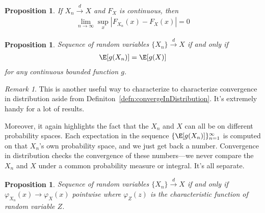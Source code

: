 \documentclass[12pt]{article}
\theoremstyle{plain}
\newtheorem{prop}[thm]{Proposition}
\theoremstyle{definition}
\theoremstyle{remark}
\newtheorem*{rmk}{Remark}
\newcommand{\ra}{\rightarrow}
\newcommand{\dto}{\xrightarrow{d}}
\newcommand{\ninf}{_{n=1}^\infty}
\newcommand{\limn}{\lim_{n\rightarrow\infty}}
\begin{document}
\begin{prop}
If $X_n\dto X$ and $F_X$ is continuous, then
\begin{align*}
  \limn \sup_x |F_{X_n}(x)-F_X(x)| = 0
\end{align*}
\end{prop}

\begin{prop}
Sequence of random variables $\{X_n\} \dto X$ if and only if
\begin{align*}
  \E[g(X_n)] = \E[g(X)]
\end{align*}
for any continuous bounded function $g$.
\end{prop}
\begin{rmk}
This is another useful way to characterize to characterize convergence
in distribution aside from Definiton~\ref{defn:convergeInDistribution}.
It's extremely handy for a lot of results.

Moreover, it again highlights the fact that the $X_n$ and $X$ can all be
on different probability spaces. Each expectation in the sequence
$\{\E[g(X_n)]\}\ninf$ is computed on that $X_n$'s own probability space,
and we just get back a number. Convergence in distribution checks the
convergence of these numbers---we never compare the $X_n$ and $X$ under
a common probability measure or integral. It's all separate.
\end{rmk}

\begin{prop}
Sequence of random variables $\{X_n\} \dto X$ if and only if
$\varphi_{X_n}(x) \ra \varphi_X(x)$ pointwise where $\varphi_Z(z)$ is
the characteristic function of random variable $Z$.
\end{prop}
\end{document}

